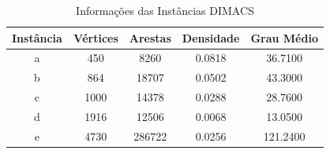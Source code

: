 \begin{table}
\centering
\caption{Informações das Instâncias DIMACS}
\label{tab:informacoes_dimacs_2}
\begin{tabular}{ccccc}
\toprule
Instância & Vértices & Arestas & Densidade & Grau Médio \\
\midrule
a & 450 & 8260 & 0.0818 & 36.7100 \\
b & 864 & 18707 & 0.0502 & 43.3000 \\
c & 1000 & 14378 & 0.0288 & 28.7600 \\
d & 1916 & 12506 & 0.0068 & 13.0500 \\
e & 4730 & 286722 & 0.0256 & 121.2400 \\
\bottomrule
\end{tabular}
\end{table}
